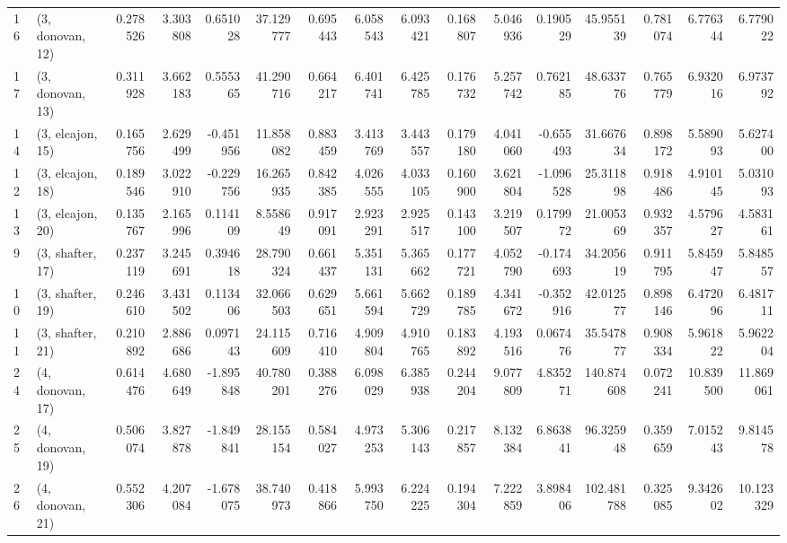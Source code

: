 \begin{tabular}{llrrrrrrrrrrrrrr}
16 &  (3, donovan, 12) &   0.278526 &  3.303808 &  0.651028 &  37.129777 &  0.695443 &   6.058543 &  6.093421 &  0.168807 &  5.046936 &  0.190529 &   45.955139 &  0.781074 &   6.776344 &   6.779022 \\
17 &  (3, donovan, 13) &   0.311928 &  3.662183 &  0.555365 &  41.290716 &  0.664217 &   6.401741 &  6.425785 &  0.176732 &  5.257742 &  0.762185 &   48.633776 &  0.765779 &   6.932016 &   6.973792 \\
14 &  (3, elcajon, 15) &   0.165756 &  2.629499 & -0.451956 &  11.858082 &  0.883459 &   3.413769 &  3.443557 &  0.179180 &  4.041060 & -0.655493 &   31.667634 &  0.898172 &   5.589093 &   5.627400 \\
12 &  (3, elcajon, 18) &   0.189546 &  3.022910 & -0.229756 &  16.265935 &  0.842385 &   4.026555 &  4.033105 &  0.160900 &  3.621804 & -1.096528 &   25.311898 &  0.918486 &   4.910145 &   5.031093 \\
13 &  (3, elcajon, 20) &   0.135767 &  2.165996 &  0.114109 &   8.558649 &  0.917091 &   2.923291 &  2.925517 &  0.143100 &  3.219507 &  0.179972 &   21.005369 &  0.932357 &   4.579627 &   4.583161 \\
9  &  (3, shafter, 17) &   0.237119 &  3.245691 &  0.394618 &  28.790324 &  0.661437 &   5.351131 &  5.365662 &  0.177721 &  4.052790 & -0.174693 &   34.205619 &  0.911795 &   5.845947 &   5.848557 \\
10 &  (3, shafter, 19) &   0.246610 &  3.431502 &  0.113406 &  32.066503 &  0.629651 &   5.661594 &  5.662729 &  0.189785 &  4.341672 & -0.352916 &   42.012577 &  0.898146 &   6.472096 &   6.481711 \\
11 &  (3, shafter, 21) &   0.210892 &  2.886686 &  0.097143 &  24.115609 &  0.716410 &   4.909804 &  4.910765 &  0.183892 &  4.193516 &  0.067476 &   35.547877 &  0.908334 &   5.961822 &   5.962204 \\
24 &  (4, donovan, 17) &   0.614476 &  4.680649 & -1.895848 &  40.780201 &  0.388276 &   6.098029 &  6.385938 &  0.244204 &  9.077809 &  4.835271 &  140.874608 &  0.072241 &  10.839500 &  11.869061 \\
25 &  (4, donovan, 19) &   0.506074 &  3.827878 & -1.849841 &  28.155154 &  0.584027 &   4.973253 &  5.306143 &  0.217857 &  8.132384 &  6.863841 &   96.325948 &  0.359659 &   7.015243 &   9.814578 \\
26 &  (4, donovan, 21) &   0.552306 &  4.207084 & -1.678075 &  38.740973 &  0.418866 &   5.993750 &  6.224225 &  0.194304 &  7.222859 &  3.898406 &  102.481788 &  0.325085 &   9.342602 &  10.123329 \\

\end{tabular}
